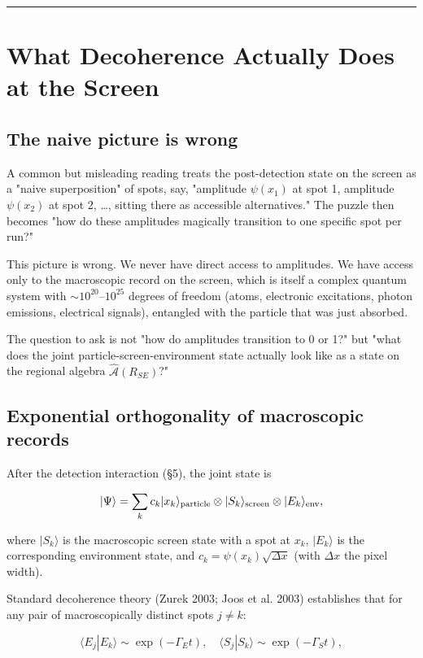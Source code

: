 \documentclass[11pt,a4paper]{article}
\begin{document}
\medskip\hrule\medskip

\section{What Decoherence Actually Does at the Screen}

\subsection{The naive picture is wrong}

A common but misleading reading treats the post-detection state on the screen as a "naive superposition" of spots, say, "amplitude $\psi(x_1)$ at spot 1, amplitude $\psi(x_2)$ at spot 2, …, sitting there as accessible alternatives." The puzzle then becomes "how do these amplitudes magically transition to one specific spot per run?"

This picture is wrong. We never have direct access to amplitudes. We have access only to the macroscopic record on the screen, which is itself a complex quantum system with $\sim 10^{20}$–$10^{25}$ degrees of freedom (atoms, electronic excitations, photon emissions, electrical signals), entangled with the particle that was just absorbed.

The question to ask is not "how do amplitudes transition to 0 or 1?" but "what does the joint particle-screen-environment state actually look like as a state on the regional algebra $\hat{\mathcal{A}}(R_{SE})$?"

\subsection{Exponential orthogonality of macroscopic records}

After the detection interaction (§5), the joint state is

\[
|\Psi\rangle = \sum_k c_k |x_k\rangle_{\rm particle} \otimes |S_k\rangle_{\rm screen} \otimes |E_k\rangle_{\rm env},
\]

where $|S_k\rangle$ is the macroscopic screen state with a spot at $x_k$, $|E_k\rangle$ is the corresponding environment state, and $c_k = \psi(x_k)\sqrt{\Delta x}$ (with $\Delta x$ the pixel width).

Standard decoherence theory (Zurek 2003; Joos et al. 2003) establishes that for any pair of macroscopically distinct spots $j \ne k$:

\[
\langle E_j | E_k \rangle \sim \exp(-\Gamma_E t), \quad \langle S_j | S_k \rangle \sim \exp(-\Gamma_S t),
\]
\end{document}
